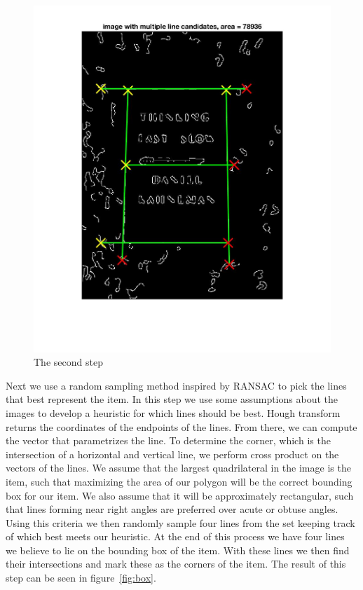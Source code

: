 \begin{figure}[t]
\begin{center}
   \includegraphics[width=0.8\linewidth]{figures/step2.jpg}
\end{center}
\caption{The second step}
\label{fig:lines}
\end{figure}

Next we use a random sampling method inspired by RANSAC to pick the lines that best represent the item.
In this step we use some assumptions about the images to develop a heuristic for which lines should be best.
Hough transform returns the coordinates of the endpoints of the lines.
From there, we can compute the vector that parametrizes the line.
To determine the corner, which is the intersection of a horizontal and vertical line, we perform cross product on the vectors of the lines.
We assume that the largest quadrilateral in the image is the item, such that maximizing the area of our polygon will be the correct bounding box for our item.
We also assume that it will be approximately rectangular, such that lines forming near right angles are preferred over acute or obtuse angles.
Using this criteria we then randomly sample four lines from the set keeping track of which best meets our heuristic.
At the end of this process we have four lines we believe to lie on the bounding box of the item.
With these lines we then find their intersections and mark these as the corners of the item.
The result of this step can be seen in figure~\ref{fig:box}.


